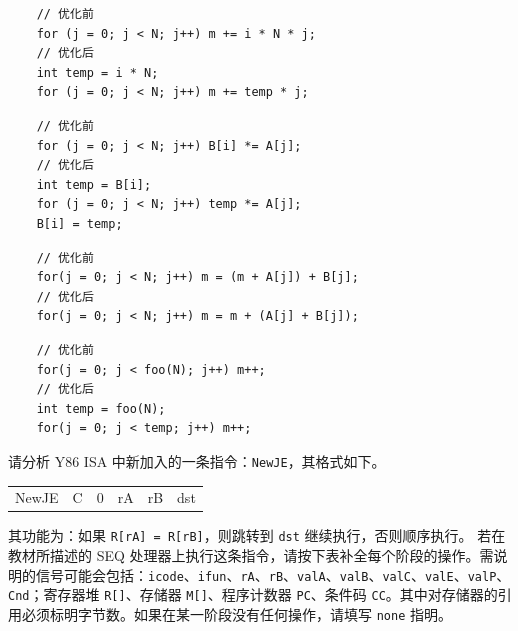\begin{problems}
        \vspace{\baselineskip}
        \begin{choices}
            \item \begin{verbatim}
    // 优化前
    for (j = 0; j < N; j++) m += i * N * j;
    // 优化后
    int temp = i * N;
    for (j = 0; j < N; j++) m += temp * j;
            \end{verbatim}
            \item \begin{verbatim}
    // 优化前
    for (j = 0; j < N; j++) B[i] *= A[j];
    // 优化后
    int temp = B[i];
    for (j = 0; j < N; j++) temp *= A[j];
    B[i] = temp;
            \end{verbatim}
            \item \begin{verbatim}
    // 优化前
    for(j = 0; j < N; j++) m = (m + A[j]) + B[j];
    // 优化后
    for(j = 0; j < N; j++) m = m + (A[j] + B[j]);
            \end{verbatim}
            \item \begin{verbatim}
    // 优化前
    for(j = 0; j < foo(N); j++) m++;
    // 优化后
    int temp = foo(N);
    for(j = 0; j < temp; j++) m++;
            \end{verbatim}
        \end{choices}
         请分析 Y86 ISA 中新加入的一条指令：\verb|NewJE|，其格式如下。
        \begin{table}[H]
            \centering
            \begin{tabular}{c|c|c|c|c|c|}
                \cline{2-6}
                NewJE & C & 0 & rA & rB & dst \\ \cline{2-6} 
            \end{tabular}
        \end{table}
        其功能为：如果 \verb|R[rA] = R[rB]|，则跳转到 \verb|dst| 继续执行，否则顺序执行。
        \qn 若在教材所描述的 SEQ 处理器上执行这条指令，请按下表补全每个阶段的操作。需说明的信号可能会包括：\verb|icode|、\verb|ifun|、\verb|rA|、\verb|rB|、\verb|valA|、\verb|valB|、\verb|valC|、\verb|valE|、\verb|valP|、\verb|Cnd|；寄存器堆 \verb|R[]|、存储器 \verb|M[]|、程序计数器 \verb|PC|、条件码 \verb|CC|。其中对存储器的引用必须标明字节数。如果在某一阶段没有任何操作，请填写 \texttt{none} 指明。

\end{problems}
